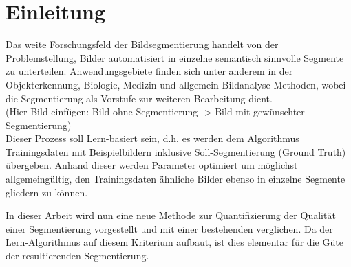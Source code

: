 \chapter{Einleitung}\label{ch:introduction}

Das weite Forschungsfeld der Bildsegmentierung handelt von der Problemstellung, Bilder automatisiert in einzelne semantisch sinnvolle Segmente zu unterteilen. Anwendungsgebiete finden sich unter anderem in der Objekterkennung, Biologie, Medizin und allgemein Bildanalyse-Methoden, wobei die Segmentierung als Vorstufe zur weiteren Bearbeitung dient. \\

(Hier Bild einfügen: Bild ohne Segmentierung -> Bild mit gewünschter Segmentierung) \\

Dieser Prozess soll Lern-basiert sein, d.h. es werden dem Algorithmus Trainingsdaten mit Beispielbildern inklusive Soll-Segmentierung (Ground Truth) übergeben. Anhand dieser werden Parameter optimiert um möglichst allgemeingültig, den Trainingsdaten ähnliche Bilder ebenso in einzelne Segmente gliedern zu können.

In dieser Arbeit wird nun eine neue Methode zur Quantifizierung der Qualität einer Segmentierung vorgestellt und mit einer bestehenden verglichen. Da der Lern-Algorithmus auf diesem Kriterium aufbaut, ist dies elementar für die Güte der resultierenden Segmentierung.



